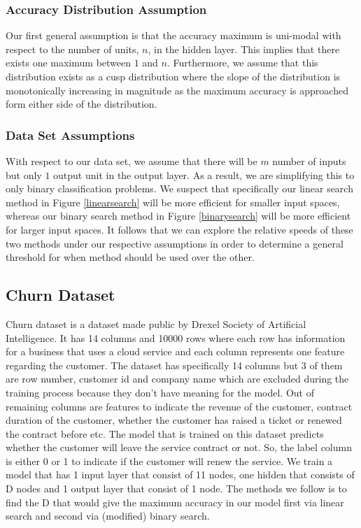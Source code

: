 \documentclass[conference]{IEEEtran}
\begin{document}
\subsubsection{Accuracy Distribution Assumption}

Our first general assumption is that the accuracy maximum is uni-modal with respect to the number of units, $n$, in the hidden layer. This implies that there exists one maximum between $1$ and $n$. Furthermore, we assume that this distribution exists as a cusp  distribution where the slope of the distribution is monotonically increasing in magnitude as the maximum accuracy is approached form either side of the distribution.

\subsubsection{Data Set Assumptions} \label{datasetaummption}

With respect to our data set, we assume that there will be $m$ number of inputs but only $1$ output unit in the output layer. As a result, we are simplifying this to only binary classification problems. We suspect that specifically our linear search method in Figure \autoref{linearsearch} will be more efficient for smaller input spaces, whereas our binary search method in Figure \autoref{binarysearch} will be more efficient for larger input spaces. It follows that we can explore the relative speeds of these two methods under our respective assumptions in order to determine a general threshold for when method should be used over the other.

\subsection{Churn Dataset}
Churn dataset is a dataset made public by Drexel Society of Artificial Intelligence\cite{churndataset}. It has 14 columns and 10000 rows where each row has information for a business that uses a cloud service and each column represents one feature regarding the customer. The dataset has specifically 14 columns but 3 of them are row number, customer id and company name which are excluded during the training process because they don't have meaning for the model. Out of remaining columns are features to indicate the revenue of the customer, contract duration of the customer, whether the customer has raised a ticket or renewed the contract before etc. The model that is trained on this dataset predicts whether the customer will leave the service contract or not. So, the label column is either 0 or 1 to indicate if the customer will renew the service. We train a model that has 1 input layer that consist of 11 nodes, one hidden that consists of D nodes and 1 output layer that consist of 1 node. The methods we follow is to find the D that would give the maximum accuracy in our model first via linear search and second via (modified) binary search. 
\end{document}
